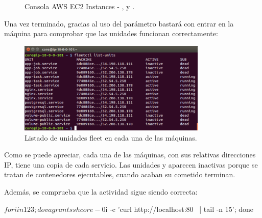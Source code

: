 \begin{figure}[H]
\caption{Consola AWS EC2 Instances - ,  y .}
\end{figure}

Una vez terminado, gracias al uso del parámetro  bastará con entrar en la máquina  para comprobar que las unidades funcionan correctamente:


\begin{figure}[H]
\centering
\includegraphics[width=0.8\textwidth]{images/figures/fleetctl-list-units.png}
\caption{Listado de unidades fleet en cada una de las máquinas.}
\end{figure}

Como se puede apreciar, cada una de las máquinas, con sus relativas direcciones IP, tiene una copia de cada servicio. Las unidades  y  aparecen inactivas porque se tratan de contenedores ejecutables, cuando acaban su cometido terminan.

Además, se comprueba que la actividad sigue siendo correcta:

\begin{code}
$ for i in 1 2 3; do vagrant ssh core-0$i -c 'curl http://localhost:80 \
  | tail -n 15'; done
\end{code}

